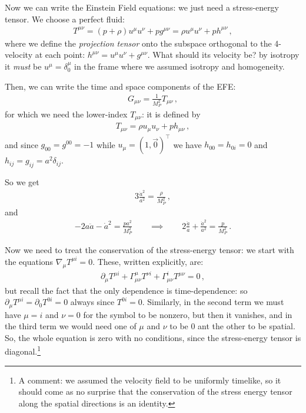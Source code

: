 \documentclass[main.tex]{subfiles}
\begin{document}
%
Now we can write the Einstein Field equations: we just need a stress-energy tensor. We choose a perfect fluid: 
%
\begin{align}
T^{\mu \nu } = (p + \rho ) u^{\mu } u^{\nu } + p g^{\mu \nu } = \rho u^{\mu } u^{\nu } + p h^{\mu \nu }
\,,
\end{align}
%
where we define the \emph{projection tensor} onto the subspace orthogonal to the 4-velocity at each point: \(h^{\mu \nu } = u^{\mu } u^{\nu } + g^{\mu \nu }\). 
What should its velocity be? 
by isotropy it \emph{must} be \(u^{\mu } = \delta^{\mu }_{0}\) in the frame where we assumed isotropy and homogeneity.

Then, we can write the time and space components of the EFE: 
%
\begin{align}
G_{\mu \nu } = \frac{1}{M_P^2} T_{\mu \nu }
\,,
\end{align}
%
for which we need the lower-index \(T_{\mu \nu }\): it is defined by 
%
\begin{align}
T_{\mu \nu } = \rho u_{\mu} u_{\nu } + p h_{\mu \nu }
\,,
\end{align}
%
and since \(g_{00} = g^{00 } = -1\) while \(u_{\mu } = (1, \vec{0})^{\top}\) we have \(h_{00} = h_{0i} =  0\) and \(h_{ij} = g_{ij} =  a^2 \delta_{ij}\).

So we get 
%
\begin{align}
3 \frac{\dot{a}^2}{a^2} = \frac{\rho}{M_P^2}
\,,
\end{align}
%
and 
%
\begin{align}
-2 a \ddot{a} - \dot{a}^2 = \frac{p a^2}{M_P^2}
\qquad \implies \qquad
2 \frac{\ddot{a}}{a} + \frac{\dot{a}^2}{a^2} = \frac{p}{M_P^2}
\,.
\end{align}

Now we need to treat the conservation of the stress-energy tensor: we start with the equations \(\nabla_{\mu } T^{\mu  i } = 0 \). These, written explicitly, are: 
%
\begin{align}
\partial_{\mu } T^{\mu i} + \Gamma^{\mu }_{\mu \nu } T^{\nu i } + \Gamma^{i}_{\mu \nu } T^{\mu \nu } =0 
\,,
\end{align}
%
but recall the fact that the only dependence is time-dependence: so \(\partial_{\mu } T^{\mu i} = \partial_{0} T^{0i}=0\) always since \(T^{0i}= 0\). 
Similarly, in the second term we must have \(\mu =i\) and \(\nu = 0\) for the symbol to be nonzero, but then it vanishes, and in the third term we would need one of \(\mu \) and \(\nu \) to be 0 ant the other to be spatial. So, the whole equation is zero with no conditions, since the stress-energy tensor is diagonal.\footnote{A comment: we assumed the velocity field to be uniformly timelike, so it should come as no surprise that the conservation of the stress energy tensor along the spatial directions is an identity.}
\end{document}
